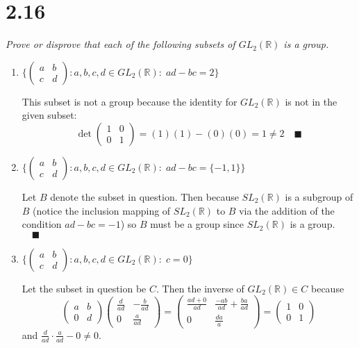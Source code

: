\documentclass[12pt]{article}
\newcommand{\R}{\mathbb{R}}
\newcommand{\qed}{\quad \blacksquare}
\begin{document}
\section*{2.16}
\emph{Prove or disprove that each of the following subsets of $GL_2(\R)$ is a group.}
\begin{enumerate}[label=(\alph*)]
    \item $\{\begin{pmatrix}
        a & b\\
        c & d
    \end{pmatrix}: a, b, c,d \in GL_2(\R): \; ad-bc = 2\}$

    \color{blue}
        This subset is not a group because the identity for $GL_2(\R)$ is not in the given subset: 
        \[\det \begin{pmatrix}
            1 & 0\\
            0 & 1
        \end{pmatrix} = (1)(1) - (0)(0) = 1 \neq 2 \qed\]
    \color{black}

    \item $\{\begin{pmatrix}
        a & b\\
        c & d
    \end{pmatrix}: a, b, c,d \in GL_2(\R): \; ad-bc = \{-1, 1\}\}$

    \color{blue}
        Let $B$ denote the subset in question. Then because $SL_2(\R)$ is a subgroup of $B$ (notice the inclusion mapping of $SL_2(\R)$ to $B$ via the addition of the condition $ad - bc = -1$) so $B$ must be a group since $SL_2(\R)$ is a group. $\qed$
    \color{black}

    \item $\{\begin{pmatrix}
        a & b\\
        c & d
    \end{pmatrix}: a, b, c,d \in GL_2(\R): \; c = 0\}$

    \color{blue}
    Let the subset in question be $C$. Then the inverse of $GL_2(\R) \in C$ because
    \[\begin{pmatrix}
        a & b\\
        0 & d
    \end{pmatrix}\begin{pmatrix}
        \frac{d}{ad} & -\frac{b}{ad}\\
        0 & \frac{a}{ad}
    \end{pmatrix} = \begin{pmatrix}
        \frac{ad + 0}{ad} & \frac{-ab}{ad} + \frac{ba}{ad}\\
        0 & \frac{da}{a}
    \end{pmatrix} = \begin{pmatrix}
        1 & 0\\
        0 & 1
    \end{pmatrix}\]
    and $\frac{d}{ad}\cdot \frac{a}{ad} - 0 \neq 0$. 


\end{enumerate}
\end{document}
